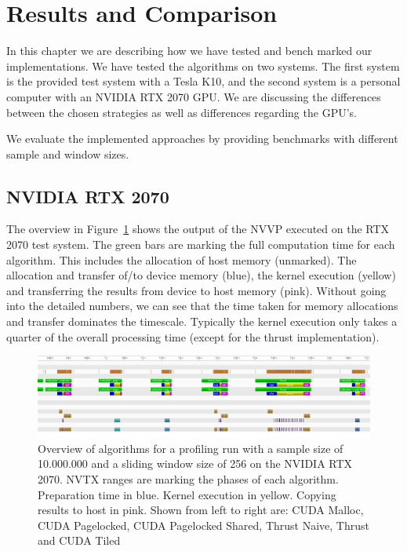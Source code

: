 \section{Results and Comparison}

In this chapter we are describing how we have tested and bench marked our implementations. We have tested the algorithms on two systems. The first system is the provided test system with a Tesla K10, and the second system is a personal computer with an NVIDIA RTX 2070 GPU. We are discussing the differences between the chosen strategies as well as differences regarding the GPU's.

We evaluate the implemented approaches by providing benchmarks with different sample and window sizes. 

\subsection{NVIDIA RTX 2070}

The overview in Figure~\ref{fig:group_picture_rtx2070} shows the output of the NVVP executed on the RTX 2070 test system. The green bars are marking the full computation time for each algorithm. This includes the allocation of host memory (unmarked). The allocation and transfer of/to device memory (blue), the kernel execution (yellow) and transferring the results from device to host memory (pink). Without going into the detailed numbers, we can see that the time taken for memory allocations and transfer dominates the timescale. Typically the kernel execution only takes a quarter of the overall processing time (except for the thrust implementation). 

\begin{figure}
    \centering
    \includegraphics[width=1.0\linewidth]{Figures/group_picture_rtx2070}
    \caption{Overview of algorithms for a profiling run with a sample size of 10.000.000 and a sliding window size of 256 on the NVIDIA RTX 2070. NVTX ranges are marking the phases of each algorithm. Preparation time in blue. Kernel execution in yellow. Copying results to host in pink. Shown from left to right are: CUDA Malloc, CUDA Pagelocked, CUDA Pagelocked Shared, Thrust Naive, Thrust and CUDA Tiled}
    \label{fig:group_picture_rtx2070}
\end{figure}

